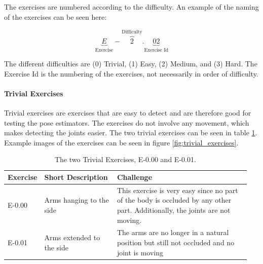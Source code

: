 The exercises are numbered according to the difficulty. An example of the naming of the exercises can be seen here:

\[
    \underbrace{E}_\text{Exercise}-\overbrace{2}^\text{Difficulty}.\underbrace{02}_\text{Exercise Id}
\]

The different difficulties are (0) Trivial, (1) Easy, (2) Medium, and (3) Hard. The Exercise Id is the numbering of the exercises, not necessarily in order of difficulty.

\paragraph{Trivial Exercises}

Trivial exercises are exercises that are easy to detect and are therefore good for testing the pose estimators. The exercises do not involve any movement, which makes detecting the joints easier. The two trivial exercises can be seen in table \ref{tab:trivial_exercises}. Example images of the exercises can be seen in figure \ref{fig:trivial_exercises}.

\begin{table}[htb]
  \caption[Trivial Exercises]{The two Trivial Exercises, E-0.00 and E-0.01.}
  \label{tab:trivial_exercises}
  \begin{tabular}{p{0.1\linewidth}p{0.3\linewidth}p{0.55\linewidth}}
  \hline
  \textbf{Exercise} & \textbf{Short Description}         & \textbf{Challenge}   \\ \hline
  E-0.00   & Arms hanging to the side  & This exercise is very easy since no part of the body is occluded by any other part. Additionally, the joints are not moving. \\
  E-0.01   & Arms extended to the side & The arms are no longer in a natural position but still not occluded and no joint is moving \\ \hline
  \end{tabular}
\end{table} 

